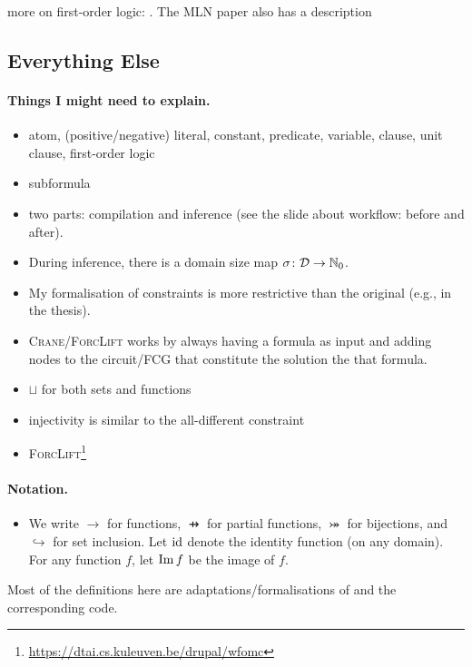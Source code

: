 more on first-order logic: \citep{DBLP:books/daglib/0023546}. The MLN paper also
has a description

\subsection{Everything Else}

\paragraph{Things I might need to explain.}
\begin{itemize}
  \item atom, (positive/negative) literal, constant, predicate, variable,
        clause, unit clause, first-order logic
  \item subformula
  \item two parts: compilation and inference (see the slide about workflow:
        before and after).
  \item During inference, there is a domain size map
        $\operatorname{\sigma}\colon \mathcal{D} \to \mathbb{N}_0$.
  \item My formalisation of constraints is more restrictive than the original
        (e.g., in the thesis).
  \item \textsc{Crane/ForcLift} works by always having a formula as input and
        adding nodes to the circuit/FCG that constitute the solution the that
        formula.
  \item $\sqcup$ for both sets and functions
  \item injectivity is similar to the all-different constraint
  \item \textsc{ForcLift}\footnote{\url{https://dtai.cs.kuleuven.be/drupal/wfomc}}
\end{itemize}

\paragraph{Notation.}
\begin{itemize}
  \item We write $\to$ for functions, $\pfun$ for partial functions,
        $\twoheadrightarrowtail$ for bijections, and $\hookrightarrow$ for set
        inclusion. Let $\operatorname{id}$ denote the identity function (on any domain). For
        any function $f$, let $\operatorname{Im} f$ be the image of $f$.
\end{itemize}

Most of the definitions here are adaptations/formalisations of
\citep{DBLP:conf/ijcai/BroeckTMDR11} and the corresponding code.


